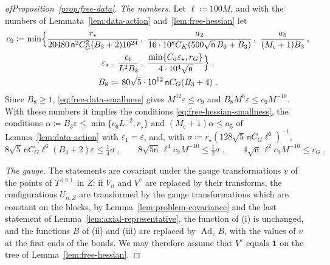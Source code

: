 \documentclass[11pt]{preprint}
\newcommand{\id}{\mathbf 1}
\newcommand{\Ad}{\operatorname{Ad}}
\numberwithin{equation}{section}
\begin{document}
\begin{proof}[ofProposition~\ref{prop:free-data}]
\emph{The numbers.} Let $\ell \coloneqq 100M$, and with the numbers of Lemmata~\ref{lem:data-action} and~\ref{lem:free-hessian} let
\begin{equation}\label{eq:free-data-numbers}
\begin{gathered}
    c_9 \coloneqq \min\Bigl\{ \frac{r_\star}{20480\,\mathsf n^2C_G^2(B_3 + 2)10^{24}}\,,\ \frac{a_2}{16 \cdot 10^8C_K(500\sqrt{\mathsf n}\,B_6 + B_3)}\,,\ \frac{a_5}{(M_{\mathrm c} + 1)B_3}\,,\\
    \varepsilon_\star\,,\ \frac{c_6}{L^2B_3}\,,\ \frac{\min\{ C_{\mathrm d}\varepsilon_\star, r_G \}}{4 \cdot 10^4\sqrt{\mathsf n}} \Bigr\}\;,\\
    B_8 \coloneqq 80\sqrt 5 \cdot 10^{12}\,\mathsf nC_G(B_3 + 4)\;.
\end{gathered}
\end{equation}
Since $B_8 \geqslant 1$, \eqref{eq:free-data-smallness} gives $M^{12}\varepsilon \leqslant c_9$ and $B_8M^6\varepsilon \leqslant c_9M^{-10}$. With these numbers it implies the conditions \eqref{eq:free-hessian-smallness}, the conditions $\alpha \coloneqq B_3\varepsilon \leqslant \min\{ c_6L^{-2}, r_\star \}$ and $(M_{\mathrm c} + 1)\alpha \leqslant a_5$ of Lemma~\ref{lem:data-action} with $\varepsilon_1 = \varepsilon$, and, with $\sigma \coloneqq r_\star(128\sqrt 5\,\mathsf nC_G\ell^6)^{-1}$,
\begin{equation}\label{eq:free-data-room}
    8\sqrt 5\,\mathsf nC_G\ell^6(B_3 + 2)\varepsilon \leqslant \tfrac{1}{4}\sigma\;,
    \qquad
    8\sqrt{5\mathsf n}\,\ell^4c_9M^{-10} \leqslant \tfrac{1}{2}\sigma\;,
    \qquad
    4\sqrt{\mathsf n}\,\ell^2c_9M^{-10} \leqslant r_G\;.
\end{equation}

\emph{The gauge.} The statements are covariant under the gauge transformations $v$ of the points of $T^{(n)}$ in $Z$: if $V_n$ and $V^e$ are replaced by their transforms, the configurations $U_{n,Z}$ are transformed by the gauge transformations which are constant on the blocks, by Lemma~\ref{lem:problem-covariance} and the last statement of Lemma~\ref{lem:axial-representative}, the function of (i) is unchanged, and the functions $B$ of (ii) and (iii) are replaced by $\Ad_vB$, with the values of $v$ at the first ends of the bonds. We may therefore assume that $V^e$ equals $\id$ on the tree of Lemma~\ref{lem:free-hessian}.


\end{proof}
\end{document}
